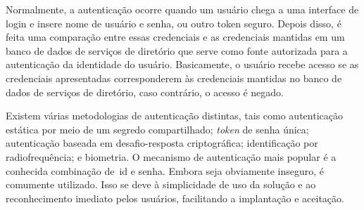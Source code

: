 Normalmente, a autenticação ocorre quando um usuário chega a uma interface de
login e insere nome de usuário e senha, ou outro token seguro.
Depois disso, é feita uma comparação entre essas credenciais e as credenciais
mantidas em um banco de dados de serviços de diretório que serve como fonte
autorizada para a autenticação da identidade do usuário.
Basicamente, o usuário recebe acesso se as credenciais apresentadas
corresponderem às credenciais mantidas no banco de dados de serviços de
diretório, caso contrário, o acesso é negado\cite[p.112]{alnaji2020}.

Existem várias metodologias de autenticação distintas,
tais como autenticação estática por meio de um segredo compartilhado;
\textit{token} de senha única; autenticação baseada em desafio-resposta
criptográfica;
identificação por radiofrequência; e biometria.
O mecanismo de autenticação mais popular é a conhecida combinação de~\acrfull{id} e senha.
Embora seja obviamente inseguro, é comumente utilizado.
Isso se deve à simplicidade de uso da solução e ao reconhecimento imediato pelos
usuários, facilitando a implantação e aceitação\cite{idrus2013}.




